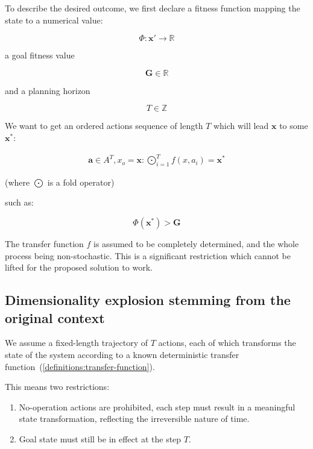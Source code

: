 \documentclass[11pt, a4paper]{article}
\begin{document}
	To describe the desired outcome, we first declare a fitness function mapping the state to a numerical value:
	
	\begin{equation}
		\Phi : \mathbf{x}' \rightarrow \mathbb{R}
	\end{equation} 
	
	a goal fitness value 
	
	\begin{equation}
		\mathbf{G} \in \mathbb{R}
	\end{equation}
	
	and a planning horizon
	
	\begin{equation}
		T \in \mathbb{Z}
	\end{equation}
	
	We want to get an ordered actions sequence of length $T$ which will lead $\mathbf{x}$ to some $\mathbf{x}^*$:
	
	\begin{eqnarray}\label{definitions:fold}
		\mathbf{a} \in A^T, x_o = \mathbf{x}: \bigodot_{i=1}^{T} f(x, a_i) = \mathbf{x}^*
	\end{eqnarray}
	
	(where $\bigodot$ is a fold operator)
	
	such as:
	
	\begin{equation}
		\Phi(\mathbf{x}^*) > \mathbf{G}
	\end{equation}
	
	The transfer function $f$ is assumed to be completely determined, and the whole process being non-stochastic. This is a significant restriction which cannot be lifted for the proposed solution to work.

	\subsection{Dimensionality explosion stemming from the original context}

	We assume a fixed-length trajectory of $𝑇$ actions, each of which transforms the state of the system according to a known deterministic transfer function~(\ref{definitions:transfer-function}).

	This means two restrictions:
	
	\begin{enumerate}
		\item No-operation actions are prohibited, each step must result in a meaningful state transformation, reflecting the irreversible nature of time.
		\item Goal state must still be in effect at the step $T$.
	\end{enumerate}
\end{document}
